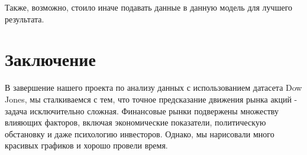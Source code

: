 \documentclass{article}
\begin{document}
Также, возможно, стоило иначе подавать данные в данную модель для лучшего результата.  

\section{Заключение}


В завершение нашего проекта по анализу данных с использованием датасета Dow Jones, мы сталкиваемся с тем, что точное предсказание движения рынка акций - задача исключительно сложная. Финансовые рынки подвержены множеству влияющих факторов, включая экономические показатели, политическую обстановку и даже психологию инвесторов. Однако, мы нарисовали много красивых графиков и хорошо провели время. 
\end{document}

